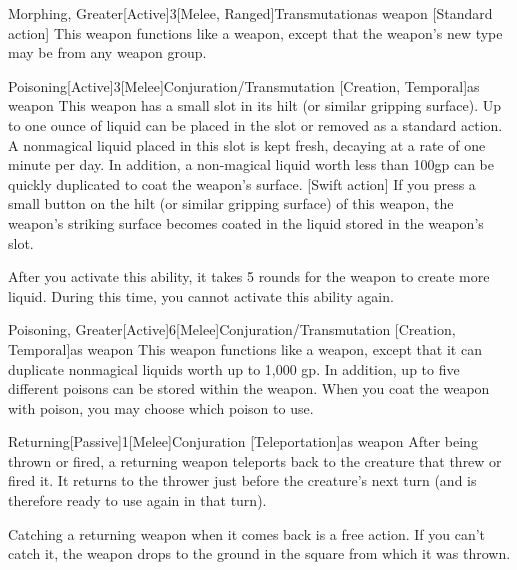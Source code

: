 \begin{magicitemdef}{Morphing, Greater}[Active]{3}[Melee, Ranged]{Transmutation}{as weapon}
    [Standard action] This weapon functions like a  weapon, except that the weapon's new type may be from any weapon group.
\end{magicitemdef}

\begin{magicitemdef}{Poisoning}[Active]{3}[Melee]{Conjuration/Transmutation [Creation, Temporal]}{as weapon}
     This weapon has a small slot in its hilt (or similar gripping surface). Up to one ounce of liquid can be placed in the slot or removed as a standard action. A nonmagical liquid placed in this slot is kept fresh, decaying at a rate of one minute per day. In addition, a non-magical liquid worth less than 100gp can be quickly duplicated to coat the weapon's surface.
    [Swift action] If you press a small button on the hilt (or similar gripping surface) of this weapon, the weapon's striking surface becomes coated in the liquid stored in the weapon's slot.

    After you activate this ability, it takes 5 rounds for the weapon to create more liquid.
    During this time, you cannot activate this ability again.
\end{magicitemdef}

\begin{magicitemdef}{Poisoning, Greater}[Active]{6}[Melee]{Conjuration/Transmutation [Creation, Temporal]}{as weapon}
     This weapon functions like a  weapon, except that it can duplicate nonmagical liquids worth up to 1,000 gp.
    In addition, up to five different poisons can be stored within the weapon.
    When you coat the weapon with poison, you may choose which poison to use.
\end{magicitemdef}

\begin{magicitemdef}{Returning}[Passive]{1}[Melee]{Conjuration [Teleportation]}{as weapon}
     After being thrown or fired, a returning weapon teleports back to the creature that threw or fired it.
    It returns to the thrower just before the creature's next turn (and is therefore ready to use again in that turn).

    Catching a returning weapon when it comes back is a free action.
    If you can't catch it, the weapon drops to the ground in the square from which it was thrown.
\end{magicitemdef}


